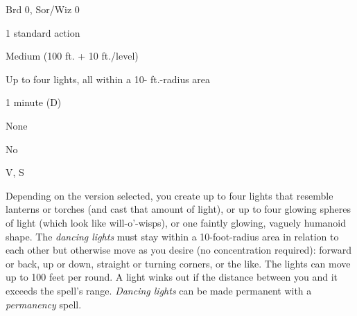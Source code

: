 
\begin{description*}
\item[Level:] Brd 0, Sor/Wiz 0
\item[Casting Time:] 1 standard action
\item[Range:] Medium (100 ft. + 10 ft./level)
\item[Effect:] Up to four lights, all within a 10- ft.-radius area
\item[Duration:] 1 minute (D)
\item[Saving Throw:] None
\item[Spell Resistance:] No
\item[Components:] V, S
\end{description*}

Depending on the version selected, you create up to four lights that resemble lanterns
or torches (and cast that amount of light), or up to four glowing spheres of light
(which look like will-o'-wisps), or one faintly glowing, vaguely humanoid shape.
The \textit{dancing lights} must stay within a 10-foot-radius area in relation
to each other but otherwise move as you desire (no concentration required): forward
or back, up or down, straight or turning corners, or the like. The lights can move
up to 100 feet per round. A light winks out if the distance between you and it
exceeds the spell's range.
\textit{Dancing lights} can be made permanent with a \textit{permanency} spell.